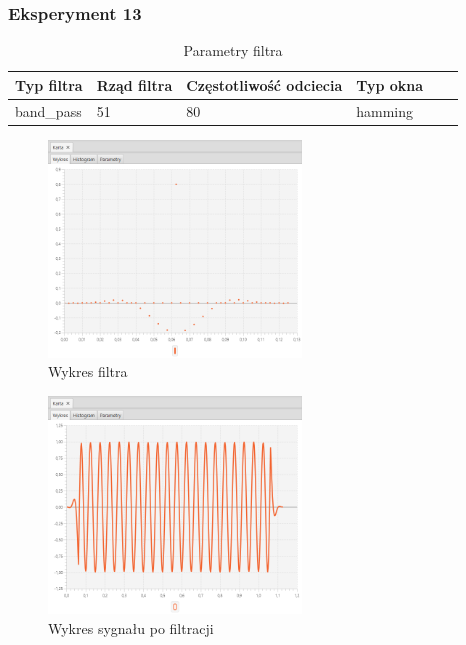 \documentclass[12pt]{article}
\begin{document}
{{            \subsubsection{Eksperyment 13} {
                \begin{table}[H]
                \centering
                \begin{tabular}{|l|l|l|l|l|l|}
                \hline
                Typ filtra & Rząd filtra & Częstotliwość odciecia & Typ okna  \\\hline
                band\_pass & 51 & 80 & hamming     \\\hline
                \end{tabular}
                \caption{Parametry filtra}
                \end{table}
                \begin{figure}[H]
                \centering
                \includegraphics[width=0.6\textwidth]{img/result/filter/experiment13/data_draw_3f_filter_data_114446.png}
                \caption{Wykres filtra}
                \end{figure}

                \begin{figure}[H]
                \centering
                \includegraphics[width=0.6\textwidth]{img/result/filter/experiment13/data_draw_3f_result_reconstr_data_114550.png}
                \caption{Wykres sygnału po filtracji}
                \end{figure}
            }
            \newpage
        }

}
\end{document}
